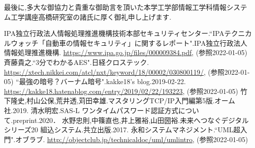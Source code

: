 \documentclass{thesis}
\begin{document}
最後に,多大な御協力と貴重な御助言を頂いた本学工学部情報工学科情報システム工学講座高橋研究室の諸氏に厚く御礼申し上げます.


\begin{thebibliography}{99}

IPA独立行政法人情報処理推進機構技術本部セキュリティセンター.“IPAテクニカルウォッチ「自動車の情報セキュリティ」に関するレポート".IPA独立行政法人情報処理推進機構.
\url{https://www.ipa.go.jp/files/000009384.pdf},
(参照2022-01-05)
斉藤貴之.“3分でわかるAES".日経クロステック.
\url{https://xtech.nikkei.com/atcl/nxt/keyword/18/00002/030800119/},
(参照2022-01-05)
“最強の暗号？バーナム暗号".kakke18's blog.2019-02-22.
\url{https://kakke18.hatenablog.com/entry/2019/02/22/193223},
(参照2022-01-05)
竹下隆史,村山公保,荒井透,苅田幸雄.マスタリングTCP/IP入門編第5版.オーム社.2019.
清水明宏.SAS-L ワンタイムパスワード認証方式について.preprint.2020．
水野忠則,中篠直也,井上雅裕,山田圀裕.未来へつなぐデジタルシリーズ20 組込システム.共立出版.2017.
永和システムマネジメント.“UML超入門".オブラブ.
\url{http://objectclub.jp/technicaldoc/uml/umlintro},
(参照2022-01-05)

\end{thebibliography}
\end{document}

